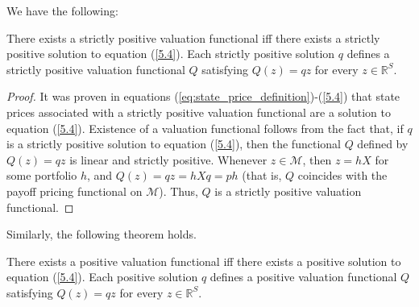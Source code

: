 \documentclass[\topdir/lecture\_notes.tex]{subfiles}
\begin{document}
We have the following:
\begin{theorem}\label{thm:strictly_positive_valuation}
There exists a strictly positive valuation functional iff there exists a strictly positive solution to equation (\ref{5.4}). Each strictly positive solution \(q\) defines a strictly positive valuation functional \(Q\) satisfying \(Q(z)=q z\) for every \(z \in \mathbb{R}^{S}\).
\end{theorem}
\begin{proof}
It was proven in equations (\ref{eq:state_price_definition})-(\ref{5.4}) that state prices associated with a strictly positive valuation functional are a solution to equation (\ref{5.4}). Existence of a valuation functional follows from the fact that, if \(q\) is a strictly positive solution to equation (\ref{5.4}), then the functional \(Q\) defined by \(Q(z)=q z\) is linear and strictly positive. Whenever \(z \in \mathcal{M}\), then \(z=h X\) for some portfolio \(h\), and \(Q(z)=q z=h X q=p h\) (that is, \(Q\) coincides with the payoff pricing functional on \(\mathcal{M}\)). Thus, \(Q\) is a strictly positive valuation functional.
\end{proof}
Similarly, the following theorem holds.
\begin{theorem}\label{thm:positive_valuation}
There exists a positive valuation functional iff there exists a positive solution to equation (\ref{5.4}). Each positive solution \(q\) defines a positive valuation functional \(Q\) satisfying \(Q(z)=q z\) for every \(z \in \mathbb{R}^{S}\).
\end{theorem}
\end{document}
